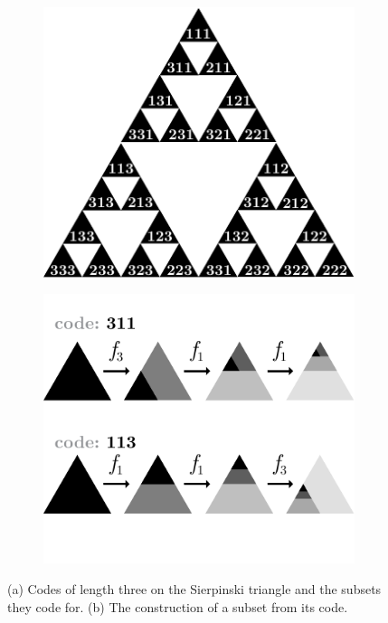 \documentclass[10pt,a4paper,oneside]{article}
\theoremstyle{definition}
\begin{document}
\begin{figure}[b!]
  \centering
  \begin{subfigure}[b]{0.48\textwidth}
    \includegraphics[width=\textwidth]{../img/sierpinski-codes.pdf}
    \caption{}
    \label{fig:sierpinski-codes}
  \end{subfigure}  
  \hspace{0.015\textwidth}
  \begin{subfigure}[b]{0.48\textwidth}
    \includegraphics[width=\textwidth]{../img/code-construction.pdf}
    \caption{}
    \label{fig:code-construction}
  \end{subfigure}

  \caption{\small (a) Codes of length three on the Sierpinski triangle and the subsets they code for. (b) The construction of a subset from its code.}
  \label{fig:codes}
\end{figure}
\end{document}
